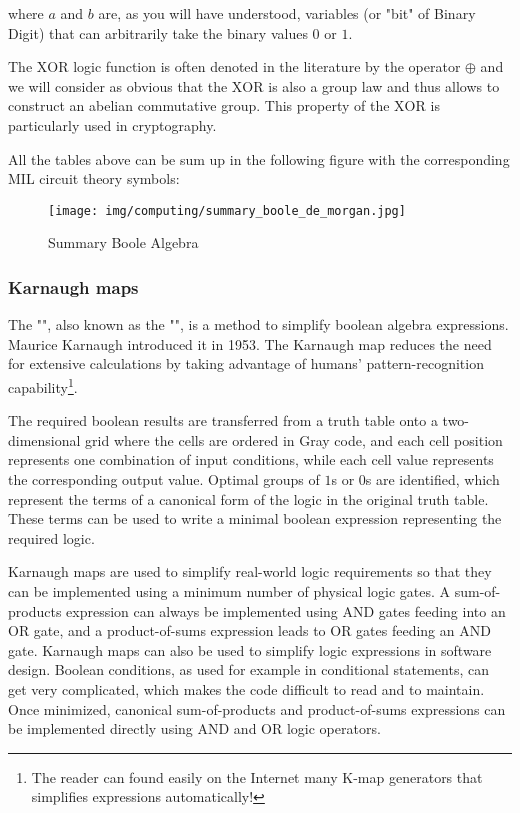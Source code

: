 	where $a$ and $b$ are, as you will have understood, variables (or "bit" of Binary Digit) that can arbitrarily take the binary values $0$ or $1$.
	\begin{tcolorbox}[title=Remark,colframe=black,arc=10pt]
	The $\mathrm{XOR}$ logic function is often denoted in the literature by the operator $\oplus$ and we will consider as obvious that the $\mathrm{XOR}$ is also a group law and thus allows to construct an abelian commutative group. This property of the $\mathrm{XOR}$ is particularly used in cryptography.
	\end{tcolorbox}
	All the tables above can be sum up in the following figure with the corresponding MIL circuit theory symbols:
	\begin{figure}[H]
		\centering
		\texttt{[image: img/computing/summary\_boole\_de\_morgan.jpg]}
		\caption{Summary Boole Algebra}
	\end{figure}
	
	\pagebreak
	\subsubsection{Karnaugh maps}
	The "", also known as the "", is a method to simplify boolean algebra expressions. Maurice Karnaugh introduced it in 1953. The Karnaugh map reduces the need for extensive calculations by taking advantage of humans' pattern-recognition capability\footnote{The reader can found easily on the Internet many K-map generators that simplifies expressions automatically!}. 
	
	The required boolean results are transferred from a truth table onto a two-dimensional grid where the cells are ordered in Gray code, and each cell position represents one combination of input conditions, while each cell value represents the corresponding output value. Optimal groups of $1$s or $0$s are identified, which represent the terms of a canonical form of the logic in the original truth table. These terms can be used to write a minimal boolean expression representing the required logic.
	
	Karnaugh maps are used to simplify real-world logic requirements so that they can be implemented using a minimum number of physical logic gates. A sum-of-products expression can always be implemented using AND gates feeding into an OR gate, and a product-of-sums expression leads to OR gates feeding an AND gate. Karnaugh maps can also be used to simplify logic expressions in software design. Boolean conditions, as used for example in conditional statements, can get very complicated, which makes the code difficult to read and to maintain. Once minimized, canonical sum-of-products and product-of-sums expressions can be implemented directly using AND and OR logic operators.
	
